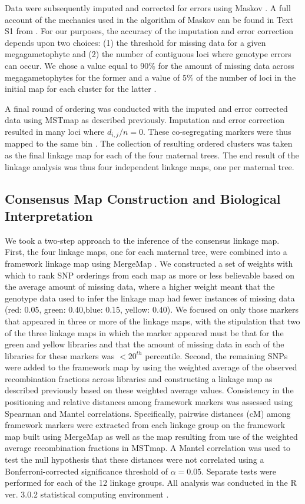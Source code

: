 \documentclass[smallextended]{svjour3}
\begin{document}
Data were subsequently imputed and corrected for errors using Maskov \citep{Ward:2013}. A full account of the mechanics used in the algorithm 
of Maskov can be found in Text S1 from \citet{Ward:2013}. For our purposes, the accuracy of the imputation and 
error correction depends upon two choices: (1) the threshold for missing data for a given megagametophyte and (2) the number of 
contiguous loci where genotype errors can occur. We chose a value equal to 90\% for the amount of 
missing data across megagametophytes for the former and a value of 5\% of the number of loci in the initial map for each 
cluster for the latter \citep[cf.][]{Ward:2013}.

A final round of ordering was conducted with the imputed and error corrected data using MSTmap as described previously. Imputation 
and error correction resulted in many loci where $d_{i,j}/n = 0$. These co-segregating markers were thus mapped to the same bin 
\citep[see][]{Wu:2008a}. The collection of resulting ordered clusters was taken as the final linkage map for each of the four maternal trees. 
The end result of the linkage analysis was thus four independent linkage maps, one per maternal tree.

\subsection*{Consensus Map Construction and Biological Interpretation}\label{ss:consensus}
We took a two-step approach to the inference of the consensus linkage map. First, the four linkage maps, one for each maternal tree, were combined
into a framework linkage map using MergeMap \citep{Wu:2008b}.  
We constructed a set of weights with which to rank SNP orderings from each map as more or less believable based on the average 
amount of missing data, where a higher weight meant that the genotype data used to infer the linkage map had fewer instances
of missing data (red: 0.05, green: 0.40,blue: 0.15, yellow: 0.40). We focused on only those markers that appeared in three or more of the linkage maps, 
with the stipulation that two of the three linkage maps in which the marker appeared must be that for the green and yellow libraries and that the
amount of missing data in each of the libraries for these markers was $< 20^{th}$ percentile. Second, the remaining SNPs were added to the framework map by
using the weighted average of the observed recombination fractions across libraries and constructing a linkage map as described previously
based on these weighted average values. Consistency in the positioning and relative distances among framework markers was assessed using
Spearman \citep{Spearman:1904} and Mantel \citep{Mantel:1967} correlations. Specifically, pairwise distances (cM) among framework markers were extracted from each linkage group on 
the framework map built using MergeMap as well as the map resulting from use of the weighted average recombination fractions in MSTmap. 
A Mantel correlation was used to test the null hypothesis that  these distances were not correlated using a Bonferroni-corrected significance threshold 
of $\alpha = 0.05$. Separate tests were performed for each of the 12 linkage groups. All analysis was conducted in the R ver. 3.0.2 statistical
computing environment \citep{R:2013}.
\end{document}
